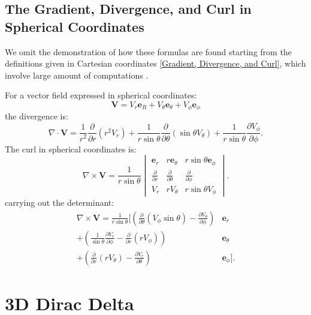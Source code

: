 \subsection{The Gradient, Divergence, and Curl in Spherical Coordinates}
We omit the demonstration of how these formulas are found starting from the 
definitions given in Cartesian coordinates \ref{Gradient, Divergence, and Curl}, 
which involve large amount of computations \cite{book-magnetism}.

For a vector field expressed in spherical coordinates:
\[
\mathbf{V} = V_r \mathbf{e}_R + V_\theta \mathbf{e}_{\theta} + V_\phi \mathbf{e}_\phi 
\]
the divergence is:
\begin{equation}
\nabla \cdot \mathbf{V} = \frac{1}{r^2} \frac{\partial}{\partial r} (r^2 V_r) + 
\frac{1}{r \sin \theta} \frac{\partial}{\partial \theta} (\sin \theta V_\theta) 
+ \frac{1}{r \sin \theta} \frac{\partial V_\phi}{\partial \phi}.
\end{equation}
The curl in spherical coordinates is:
\begin{equation}
\nabla \times \mathbf{V} = \frac{1}{r \sin \theta} \begin{vmatrix} 
    \mathbf{e}_r & r  \mathbf{e}_\theta & r \sin \theta  \mathbf{e}_\phi \\ 
    \frac{\partial}{\partial r} & \frac{\partial}{\partial \theta} & 
    \frac{\partial}{\partial \phi} \\ 
    V_r & r V_\theta & r \sin \theta V_\phi 
    \end{vmatrix}.
    \label{curl_spher}
\end{equation}
carrying out the determinant:
\begin{equation}
\begin{aligned}
\nabla \times \mathbf{V} = \frac{1}{r \sin \theta} \Bigg[ 
    \left( \frac{\partial}{\partial \theta} (V_\phi \sin \theta) - 
    \frac{\partial V_\theta}{\partial \phi} \right)  &\mathbf{e}_r \\
    + \left( \frac{1}{\sin \theta} \frac{\partial V_r}{\partial \phi} - 
    \frac{\partial}{\partial r} (r V_\phi) \right)  &\mathbf{e}_\theta \\
    + \left( \frac{\partial}{\partial r} (r V_\theta) - \frac{\partial V_r}{\partial 
    \theta} \right)  &\mathbf{e}_\phi 
\Bigg].
\end{aligned}
\end{equation}

\section{3D Dirac Delta}
